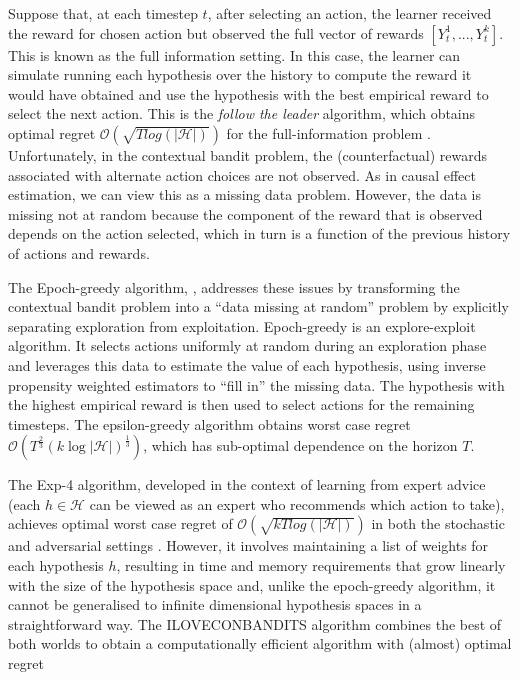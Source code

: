 \documentclass[11pt,a4paper,twoside]{report}
\newcommand{\card}[1]{\left\vert{#1}\right\vert}
\newcommand{\bigo}[1]{\mathcal{O}\left( #1 \right)}
\newcommand{\cfb}[2]{{#1}_t^{#2}} %
\newcommand{\quotes}[1]{``#1''}
\theoremstyle{plain}
\theoremstyle{definition}
\begin{document}
Suppose that, at each timestep $t$, after selecting an action, the learner received the reward for chosen action but observed the full vector of rewards $[\cfb{Y}{1},...,\cfb{Y}{k}]$. This is known as the full information setting. In this case, the learner can simulate running each hypothesis over the history to compute the reward it would have obtained and use the hypothesis with the best empirical reward to select the next action. This is the \emph{follow the leader} algorithm, which obtains optimal regret $\bigo{\sqrt{T log(\card{\mathcal{H}})}}$ for the full-information problem \citep{cesa2006prediction}. Unfortunately, in the contextual bandit problem, the (counterfactual) rewards associated with alternate action choices are not observed. As in causal effect estimation, we can view this as a missing data problem. However, the data is missing not at random because the component of the reward that is observed depends on the action selected, which in turn is a function of the previous history of actions and rewards. 

The Epoch-greedy algorithm, \citep{Langford2008}, addresses these issues by transforming the contextual bandit problem into a \quotes{data missing at random} problem by explicitly separating exploration from exploitation. Epoch-greedy is an explore-exploit algorithm. It selects actions uniformly at random during an exploration phase and leverages this data to estimate the value of each hypothesis, using inverse propensity weighted estimators to \quotes{fill in} the missing data. The hypothesis with the highest empirical reward is then used to select actions for the remaining timesteps. The epsilon-greedy algorithm obtains worst case regret $\bigo{T^{\frac{2}{3}}(k \log{\card{\mathcal{H}}})^{\frac{1}{3}}}$, which has sub-optimal dependence on the horizon $T$.

The Exp-4 algorithm, developed in the context of learning from expert advice (each $h \in \mathcal{H}$ can be viewed as an expert who recommends which action to take), achieves optimal worst case regret of $\bigo{\sqrt{kT log(\card{\mathcal{H}})}}$ in both the stochastic and adversarial settings \citep{Auer2002a}. However, it involves maintaining a list of weights for each hypothesis $h$, resulting in time and memory requirements that grow linearly with the size of the hypothesis space and, unlike the epoch-greedy algorithm, it cannot be generalised to infinite dimensional hypothesis spaces in a straightforward way. The ILOVECONBANDITS algorithm combines the best of both worlds to obtain a computationally efficient algorithm with (almost) optimal regret \citep{Agarwal2014}
\end{document}
